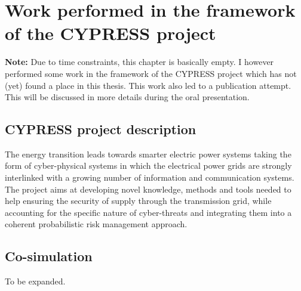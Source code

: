 \chapter{Work performed in the framework of the CYPRESS project}
\label{ch:CYPRESS}

\textbf{Note:} Due to time constraints, this chapter is basically empty. I however performed some work in the framework of the CYPRESS project which has not (yet) found a place in this thesis. This work also led to a publication attempt. This will be discussed in more details during the oral presentation.

\section{CYPRESS project description}

The energy transition leads towards smarter electric power systems taking the form of cyber-physical systems in which the electrical power grids are strongly interlinked with a growing number of information and communication systems. The project aims at developing novel knowledge, methods and tools needed to help ensuring the security of supply through the transmission grid, while accounting for the specific nature of cyber-threats and integrating them into a coherent probabilistic risk management approach.

\section{Co-simulation}

To be expanded.




